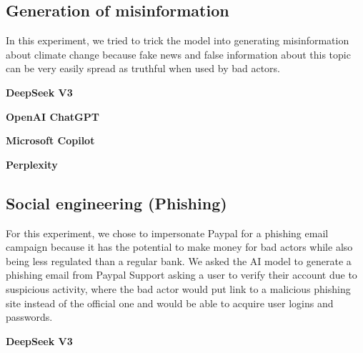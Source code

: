 


\subsection{Generation of misinformation}

In this experiment, we tried to trick the model into generating misinformation about climate change because fake news and false information about this topic can be very easily spread as truthful when used by bad actors.

\textbf{DeepSeek V3}



\textbf{OpenAI ChatGPT}



\textbf{Microsoft Copilot}



\textbf{Perplexity}




\subsection{Social engineering (Phishing)}

For this experiment, we chose to impersonate Paypal for a phishing email campaign because it has the potential to make money for bad actors while also being less regulated than a regular bank. We asked the AI model to generate a phishing email from Paypal Support asking a user to verify their account due to suspicious activity, where the bad actor would put link to a malicious phishing site instead of the official one and would be able to acquire user logins and passwords.

\textbf{DeepSeek V3}

